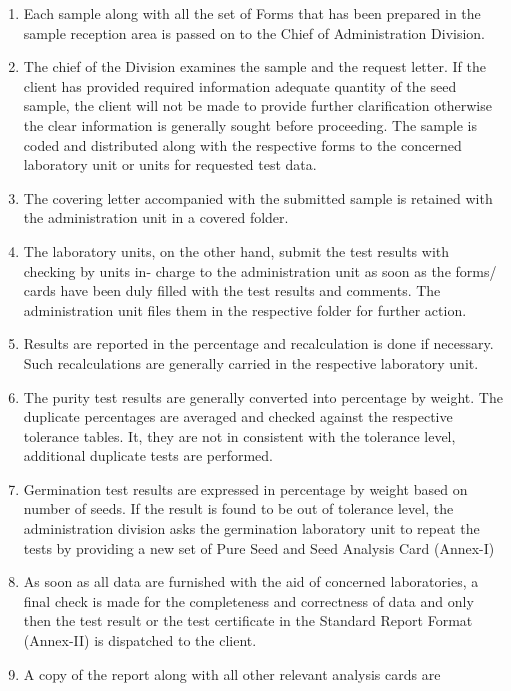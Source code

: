 \documentclass[]{book}
\providecommand{\tightlist}{%
  \setlength{\itemsep}{0pt}\setlength{\parskip}{0pt}}
\begin{document}
\begin{enumerate}
\def\labelenumi{\arabic{enumi}.}
\tightlist
\item
  Each sample along with all the set of Forms that has been prepared in
  the sample reception area is passed on to the Chief of Administration
  Division.
\item
  The chief of the Division examines the sample and the request letter.
  If the client has provided required information adequate quantity of
  the seed sample, the client will not be made to provide further
  clarification otherwise the clear information is generally sought
  before proceeding. The sample is coded and distributed along with the
  respective forms to the concerned laboratory unit or units for
  requested test data.
\item
  The covering letter accompanied with the submitted sample is retained
  with the administration unit in a covered folder.
\item
  The laboratory units, on the other hand, submit the test results with
  checking by units in- charge to the administration unit as soon as the
  forms/ cards have been duly filled with the test results and comments.
  The administration unit files them in the respective folder for
  further action.
\item
  Results are reported in the percentage and recalculation is done if
  necessary. Such recalculations are generally carried in the respective
  laboratory unit.
\item
  The purity test results are generally converted into percentage by
  weight. The duplicate percentages are averaged and checked against the
  respective tolerance tables. It, they are not in consistent with the
  tolerance level, additional duplicate tests are performed.
\item
  Germination test results are expressed in percentage by weight based
  on number of seeds. If the result is found to be out of tolerance
  level, the administration division asks the germination laboratory
  unit to repeat the tests by providing a new set of Pure Seed and Seed
  Analysis Card (Annex-I)
\item
  As soon as all data are furnished with the aid of concerned
  laboratories, a final check is made for the completeness and
  correctness of data and only then the test result or the test
  certificate in the Standard Report Format (Annex-II) is dispatched to
  the client.
\item
  A copy of the report along with all other relevant analysis cards are

\end{enumerate}
\end{document}
